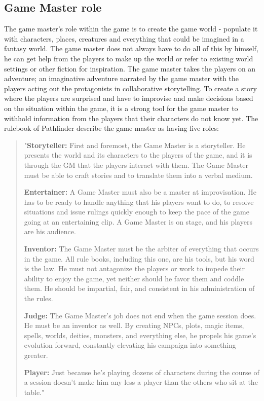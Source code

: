 \subsection*{Game Master role}
The game master's role within the game is to create the game world - populate it with characters, places, creatures and everything that could be imagined in a fantasy world. The game master does not always have to do all of this by himself, he can get help from the players to make up the world or refer to existing world settings or other fiction for inspiration. The game master takes the players on an adventure; an imaginative adventure narrated by the game master with the players acting out the protagonists in collaborative storytelling. To create a story where the players are surprised and have to improvise and make decisions based on the situation within the game, it is a strong tool for the game master to withhold information from the players that their characters do not know yet.
The rulebook of Pathfinder describe the game master as having five roles:
\begin{quote}
"\textbf{Storyteller:} First and foremost, the Game Master is a storyteller. He presents the world and its characters to the players of the game, and it is through the GM that the players interact with them. The Game Master must be able to craft stories and to translate them into a verbal medium.

\textbf{Entertainer:} A Game Master must also be a master at improvisation. He has to be ready to handle anything that his players want to do, to resolve situations and issue rulings quickly enough to keep the pace of the game going at an entertaining clip. A Game Master is on stage, and his players are his audience.

\textbf{Inventor:} The Game Master must be the arbiter of everything that occurs in the game. All rule books, including this one, are his tools, but his word is the law. He must not antagonize the players or work to impede their ability to enjoy the game, yet neither should he favor them and coddle them. He should be impartial, fair, and consistent in his administration of the rules.

\textbf{Judge:} The Game Master's job does not end when the game session does. He must be an inventor as well. By creating NPCs, plots, magic items, spells, worlds, deities, monsters, and everything else, he propels his game's evolution forward, constantly elevating his campaign into something greater.

\textbf{Player:} Just because he's playing dozens of characters during the course of a session doesn't make him any less a player than the others who sit at the table."\cite{PFcore}

\end{quote}

